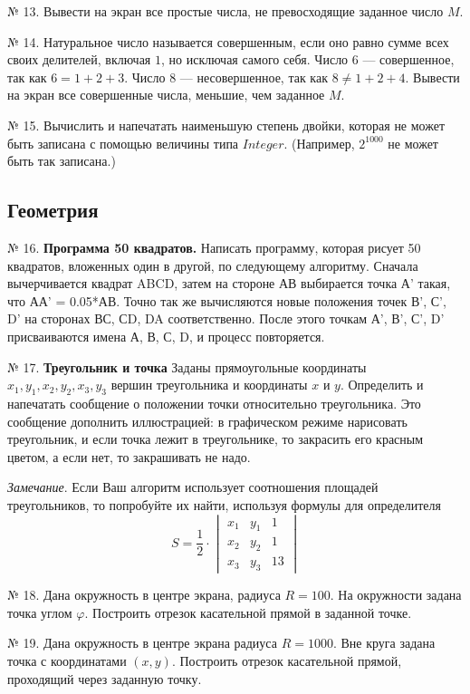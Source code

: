 № 13. Вывести на экран все простые числа, не превосходящие заданное число $M$.

№ 14. Натуральное число называется совершенным, если оно равно сумме всех своих делителей, включая $1$, но исключая самого себя. Число $6$ --- совершенное, так как $6 = 1 + 2 + 3$. Число $8$ --- несовершенное, так как $8\neq 1 + 2 + 4$. Вывести на экран все совершенные числа, меньшие, чем заданное $M$.

№ 15. Вычислить и напечатать наименьшую степень двойки, которая не может быть записана с помощью величины типа $Integer$. (Например, $2^{1000}$ не может быть так записана.)

\subsection{Геометрия}

№ 16. {\bf Программа 50 квадратов.} Написать программу, которая рисует 50 квадратов, вложенных один в другой, по следующему алгоритму. Сначала вычерчивается квадрат ABCD, затем на стороне АВ выбирается точка А' такая, что АА' = 0.05*АВ. Точно так же вычисляются новые положения точек В', С', D' на сторонах ВС, СD, DA соответственно. После этого точкам А', В', С', D' присваиваются имена А, В, С, D, и процесс повторяется.

№ 17. {\bf Треугольник и точка} 
Заданы   прямоугольные координаты $x_1, y_1,x_2,y_2,x_3,y_3$ вершин треугольника и координаты $x$ и $y$. Определить и напечатать сообщение о положении точки относительно треугольника. Это сообщение дополнить иллюстрацией: в графическом режиме нарисовать треугольник, и если точка лежит в треугольнике, то закрасить его красным цветом, а если нет, то закрашивать не надо.

{\em Замечание}.   Если Ваш алгоритм использует соотношения площадей треугольников, то попробуйте их найти, используя формулы для определителя
$$S = \frac{1}{2} 
\cdot\begin{vmatrix} 
    x_1 & y_1 & 1\\
    x_2 & y_2 & 1\\
    x_3 & y_3 & 13
\end{vmatrix}
$$

№ 18. Дана окружность в центре экрана, радиуса $R=100$.  На окружности задана точка углом $\varphi$. Построить отрезок касательной прямой в заданной точке.

№ 19. Дана окружность в центре экрана радиуса $R=100$0. Вне круга задана точка с координатами $(x,y)$. Построить отрезок касательной прямой, проходящий через заданную точку.

